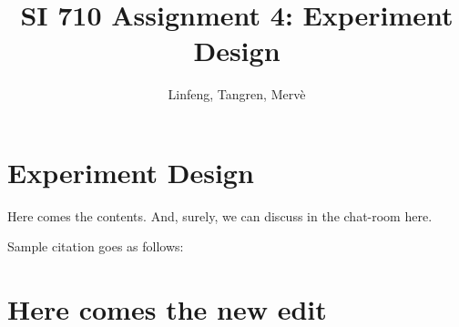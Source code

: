 \documentclass{article}
\title{SI 710 Assignment 4: Experiment Design}
\author{Linfeng, Tangren, Merv\`e}
\date{}
\begin{document}
\maketitle

\section{Experiment Design}

Here comes the contents. And, surely, we can discuss in the chat-room here.

Sample citation goes as follows: \cite{adams1995hitchhiker}


\section{Here comes the new edit}



\end{document}
